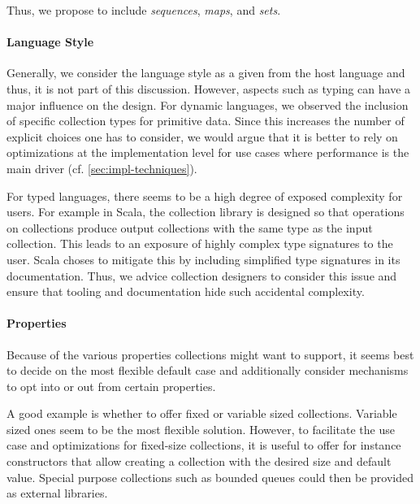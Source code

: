 \documentclass[sigconf, authorversion]{acmart}
\begin{document}
Thus, we propose to include \emph{sequences}, \emph{maps}, and \emph{sets}.

\paragraph{Language Style}

Generally, we consider the language style as a given from the host language
and thus, it is not part of this discussion.
However, aspects such as typing can have a major influence on the design.
For dynamic languages,
we observed the inclusion of specific collection types for primitive data.
Since this increases the number of explicit choices one has to consider,
we would argue that it is better to rely on optimizations
at the implementation level for use cases
where performance is the main driver (cf. \cref{sec:impl-techniques}).

For typed languages, there seems to be a high degree of exposed complexity
for users.
For example in Scala, the collection library is designed
so that operations on collections produce output collections
with the same type as the input collection\citep{Odersky:2009}.
This leads to an exposure of highly complex type signatures to the user.
Scala choses to mitigate this by including simplified type signatures
in its documentation.
Thus, we advice collection designers to consider this issue
and ensure that tooling and documentation hide such accidental complexity.

\paragraph{Properties}

Because of the various properties collections might want to support,
it seems best to decide on the most flexible default case
and additionally consider mechanisms to opt into or out from certain properties.

A good example is whether to offer fixed or variable sized collections.
Variable sized ones seem to be the most flexible solution.
However, to facilitate the use case and optimizations for fixed-size collections,
it is useful to offer for instance constructors
that allow creating a collection with the desired size and default value.
Special purpose collections such as bounded queues could then be provided
as external libraries.
\end{document}
